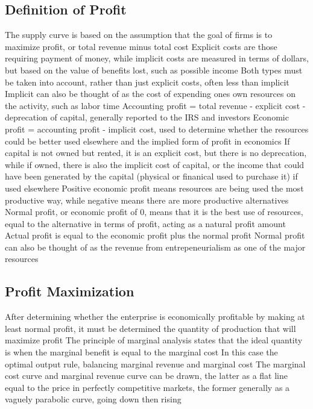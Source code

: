 \documentclass[11 pt, twoside]{article}
\newenvironment{outline*}
{
	\begin{outline}[enumerate]
	}
	{\end{outline}
}
\begin{document}
\subsection{Definition of Profit}
\begin{outline*}
\1 The supply curve is based on the assumption that the goal of firms is to maximize profit, or total revenue minus total cost
\1 Explicit costs are those requiring payment of money, while implicit costs are measured in terms of dollars, but based on the value of benefits lost, such as possible income
\2 Both types must be taken into account, rather than just explicit costs, often less than implicit
\2 Implicit can also be thought of as the cost of expending ones own resources on the activity, such as labor time
\1 Accounting profit = total revenue - explicit cost - deprecation of capital, generally reported to the IRS and investors
\1 Economic profit = accounting profit - implicit cost, used to determine whether the resources could be better used elsewhere and the implied form of profit in economics
\2 If capital is not owned but rented, it is an explicit cost, but there is no deprecation, while if owned, there is also the implicit cost of capital, or the income that could have been generated by the capital (physical or finanical used to purchase it) if used elsewhere
\2 Positive economic profit means resources are being used the most productive way, while negative means there are more productive alternatives
\2 Normal profit, or economic profit of 0, means that it is the best use of resources, equal to the alternative in terms of profit, acting as a natural profit amount
\3 Actual profit is equal to the economic profit plus the normal profit
\3 Normal profit can also be thought of as the revenue from entrepeneurialism as one of the major resources
\end{outline*}
\subsection{Profit Maximization}
\begin{outline*}
\1 After determining whether the enterprise is economically profitable by making at least normal profit, it must be determined the quantity of production that will maximize profit
\1 The principle of marginal analysis states that the ideal quantity is when the marginal benefit is equal to the marginal cost
\2 In this case the optimal output rule, balancing marginal revenue and marginal cost
\1 The marginal cost curve and marginal revenue curve can be drawn, the latter as a flat line equal to the price in perfectly competitive markets, the former generally as a vaguely parabolic curve, going down then rising
\end{outline*}
\end{document}
